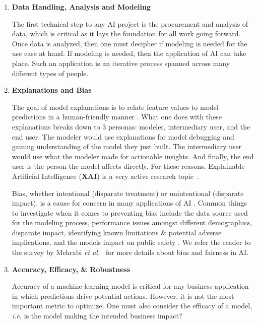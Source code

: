 \documentclass{article}
\begin{document}
\begin{enumerate}
    \item \textbf{Data Handling, Analysis and Modeling}
    
    \smallskip The first technical step to any AI project is the procurement and analysis of data, which is critical as it lays the foundation for all work going forward. Once data is analyzed, then one must decipher if modeling is needed for the use case at hand. If modeling is needed, then the application of AI can take place. Such an application is an iterative process spanned across many different types of people.
    
    \item \textbf{Explanations and Bias}
    
    \smallskip The goal of model explanations is to relate feature values to model predictions in a human-friendly manner \cite{molnar}. What one does with these explanations breaks down to 3 personas: modeler, intermediary user, and the end user. The modeler would use explanations for model debugging and gaining understanding of the model they just built. The intermediary user would use what the modeler made for actionable insights. And finally, the end user is the person the model affects directly. For these reasons, Explainable Artificial Intelligence (\textbf{XAI}) is a very active research topic~\cite{arrieta2020explainable, gunning2019xai}.
    
    \smallskip Bias, whether intentional (disparate treatment) or unintentional (disparate impact), is a cause for concern in many applications of AI \cite{bias_nist, mehrabi2021survey}. Common things to investigate when it comes to preventing bias include the data source used for the modeling process, performance issues amongst different demographics, disparate impact, identifying known limitations \& potential adverse implications, and the models impact on public safety \cite{bias}. We refer the reader to the survey by Mehrabi \emph{et al.}~\cite{mehrabi2021survey} for more details about bias and fairness in AI.
    
    \item \textbf{Accuracy, Efficacy, \& Robustness}
    
    \smallskip Accuracy of a machine learning model is critical for any business application in which predictions drive potential actions. However, it is not the most important metric to optimize. One must also consider the efficacy of a model, \emph{i.e.} is the model making the intended business impact?
    

\end{enumerate}
\end{document}
